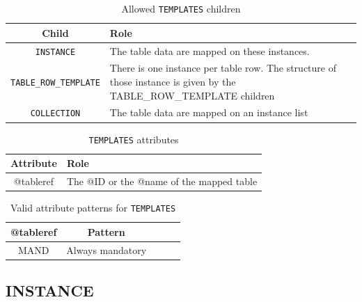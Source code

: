 \documentclass[11pt,a4paper]{ivoa}
\begin{document}
\begin{table}[hbtp]
\small
\centering
\begin{tabulary}{\linewidth}{|c|J|}       
       \hline 
           \textbf{Child} &  
           \textbf{Role}\\
       \hline         \hline  
           \texttt{INSTANCE}    & 
           The table data are mapped on these instances.  \\              
       \hline  
            \texttt{TABLE\_ROW\_TEMPLATE}    &  
            There is one instance per table row. 
             \newline The structure of those instance is given by the TABLE\_ROW\_TEMPLATE children \\              
       \hline  
             \texttt{COLLECTION}    &  
             The table data are mapped on an instance list \\       
       \hline 
     \end{tabulary}
     \caption{Allowed  \texttt{TEMPLATES} children} 
     \label{tbl:templ-children}
 \end{table}


\begin{table}[hbtp]
\small
\centering
\begin{tabulary}{\linewidth}{|c|J|}       
       \hline 
            \textbf{Attribute} & 
            \textbf {Role}\\
       \hline         \hline  
            @tableref  & 
            The @ID or the @name of the mapped table  \\
       \hline 
     \end{tabulary}
     \caption{\texttt{TEMPLATES} attributes} 
     \label{tbl:templ-att}
 \end{table}

\begin{table}[hbtp]
\small
\centering
\begin{tabulary}{\linewidth}{|c|c|c|c|J|}
    \hline 
        \textbf{@tableref} &
        \textbf{Pattern}\\
    \hline      \hline  
        MAND &   
        Always mandatory\\
   \hline 
\end{tabulary}
     \caption{Valid attribute patterns for  \texttt{TEMPLATES}} 
     \label{tbl:templ-pattern}
 \end{table}

%
%
\clearpage
\subsection{INSTANCE}
\end{document}
